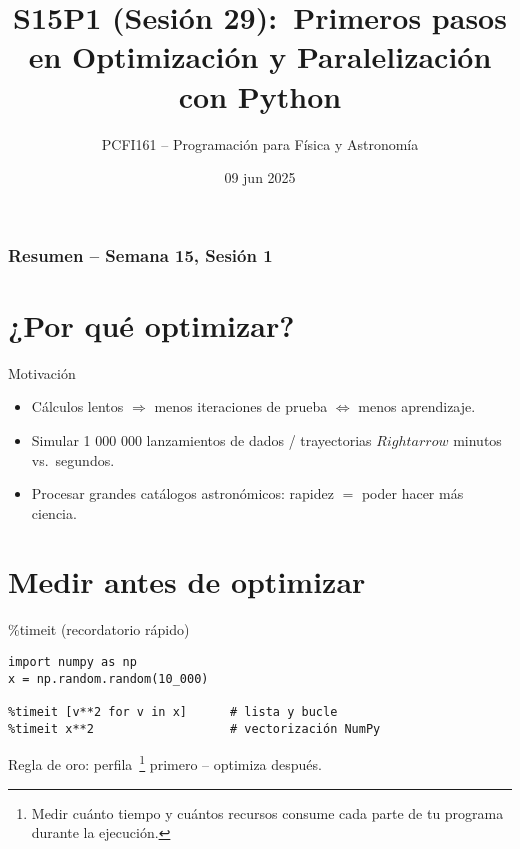 \documentclass[10pt]{beamer}
\title{S15P1 (Sesión 29):\
Primeros pasos en Optimización y Paralelización con Python}
\author{PCFI161 -- Programación para Física y Astronomía}
\date{09 jun 2025}
\begin{document}
\myfront{}
\begin{frame}\titlepage\end{frame}

\begin{frame}\frametitle{Resumen -- Semana 15, Sesión 1}\tableofcontents\end{frame}
\metroset{block=fill}

\section{¿Por qué optimizar?}
\begin{frame}{Motivación}
\begin{itemize}
  \item Cálculos lentos $\Rightarrow$  menos iteraciones de prueba $\Leftrightarrow$  menos aprendizaje.
  \item Simular 1 000 000 lanzamientos de dados / trayectorias $Rightarrow$ minutos vs.\ segundos.
  \item Procesar grandes catálogos astronómicos: rapidez $=$ poder hacer más ciencia.
\end{itemize}
\end{frame}

\section{Medir antes de optimizar}
\begin{frame}[fragile]{\%timeit (recordatorio rápido)}
\begin{verbatim}
import numpy as np
x = np.random.random(10_000)

%timeit [v**2 for v in x]      # lista y bucle
%timeit x**2                   # vectorización NumPy
\end{verbatim}
\alert{Regla de oro}: perfila~\footnote{Medir cuánto tiempo y cuántos recursos consume cada parte de tu programa durante la ejecución.} primero – optimiza después.
\end{frame}

\end{document}
